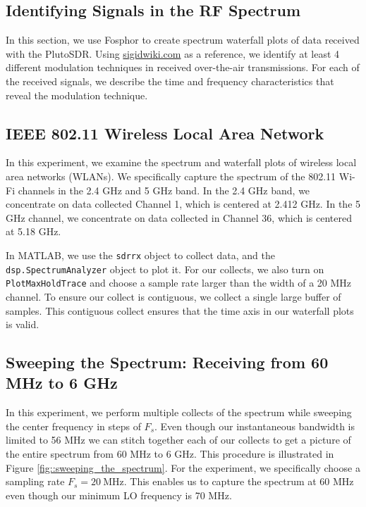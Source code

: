 \documentclass{article}
\begin{document}
\subsection{Identifying Signals in the RF Spectrum}

In this section, we use Fosphor to create spectrum waterfall plots of data received with the PlutoSDR. Using \url{sigidwiki.com} as a reference, we identify at least 4 different modulation techniques in received over-the-air transmissions. For each of the received signals, we describe the time and frequency characteristics that reveal the modulation technique.

\subsection{IEEE 802.11 Wireless Local Area Network}

In this experiment, we examine the spectrum and waterfall plots of wireless local area networks (WLANs). We specifically capture the spectrum of the 802.11 Wi-Fi channels in the 2.4 GHz and 5 GHz band. In the 2.4 GHz band, we concentrate on data collected Channel 1, which is centered at 2.412 GHz. In the 5 GHz channel, we concentrate on data collected in Channel 36, which is centered at 5.18 GHz.

In MATLAB, we use the \texttt{sdrrx} object to collect data, and the \texttt{dsp.SpectrumAnalyzer} object to plot it. For our collects, we also turn on \texttt{PlotMaxHoldTrace} and choose a sample rate larger than the width of a 20 MHz channel. To ensure our collect is contiguous, we collect a single large buffer of samples. This contiguous collect ensures that the time axis in our waterfall plots is valid.
 
\subsection{Sweeping the Spectrum: Receiving from 60 MHz to 6 GHz}

In this experiment, we perform multiple collects of the spectrum while sweeping the center frequency in steps of $F_s$. Even though our instantaneous bandwidth is limited to 56 MHz we can stitch together each of our collects to get a picture of the entire spectrum from 60 MHz to 6 GHz. This procedure is illustrated in Figure \ref{fig::sweeping_the_spectrum}. For the experiment, we specifically choose a sampling rate $F_s = 20\ \text{MHz}$. This enables us to capture the spectrum at 60 MHz even though our minimum LO frequency is 70 MHz. 
\end{document}
